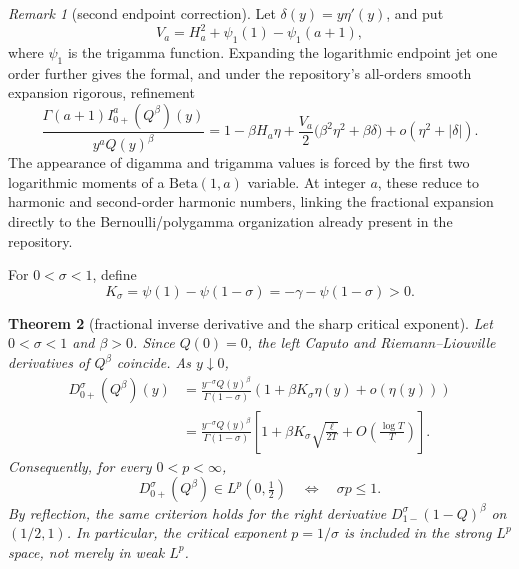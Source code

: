 \documentclass[11pt,oneside]{article}
\newtheorem{theorem}{Theorem}[section]
\theoremstyle{definition}
\theoremstyle{remark}
\newtheorem{remark}[theorem]{Remark}
\newcommand{\Q}{Q}
\newcommand{\1}{\mathbf 1}
\begin{document}
\begin{remark}[second endpoint correction]\label{p10:rem:Q-second-correction}
Let \(\delta(y)=y\eta'(y)\), and put
\begin{equation}\label{p10:eq:Va}
 V_a=H_a^2+\psi_1(1)-\psi_1(a+1),
\end{equation}
where \(\psi_1\) is the trigamma function.  Expanding the logarithmic endpoint jet one
order further gives the formal, and under the repository's all-orders smooth expansion
rigorous, refinement
\begin{equation}\label{p10:eq:Q-second-correction}
 \frac{\Gamma(a+1)I_{0+}^{a}(\Q^\beta)(y)}{y^a\Q(y)^\beta}
 =1-\beta H_a\eta
 +\frac{V_a}{2}\bigl(\beta^2\eta^2+\beta\delta\bigr)
 +o(\eta^2+|\delta|).
\end{equation}
The appearance of digamma and trigamma values is forced by the first two logarithmic
moments of a \(\mathrm{Beta}(1,a)\) variable.  At integer \(a\), these reduce to
harmonic and second-order harmonic numbers, linking the fractional expansion directly
to the Bernoulli/polygamma organization already present in the repository.
\end{remark}

For \(0<\sigma<1\), define
\begin{equation}\label{p10:eq:Ksigma}
 K_\sigma=\psi(1)-\psi(1-\sigma)
          =-\gamma-\psi(1-\sigma)>0.
\end{equation}

\begin{theorem}[fractional inverse derivative and the sharp critical exponent]
\label{p10:thm:Q-fractional-derivative-Lp}
Let \(0<\sigma<1\) and \(\beta>0\).  Since \(\Q(0)=0\), the left Caputo and
Riemann--Liouville derivatives of \(\Q^\beta\) coincide.  As \(y\downarrow0\),
\begin{align}
 D_{0+}^{\sigma}(\Q^\beta)(y)
 &=\frac{y^{-\sigma}\Q(y)^\beta}{\Gamma(1-\sigma)}
   \left(1+\beta K_\sigma\eta(y)+o(\eta(y))\right)
 \label{p10:eq:Q-frac-derivative-eta}\\
 &=\frac{y^{-\sigma}\Q(y)^\beta}{\Gamma(1-\sigma)}
   \left[
    1+\beta K_\sigma\sqrt{\frac{\ell}{2T}}
    +O\!\left(\frac{\log T}{T}\right)
   \right].
 \label{p10:eq:Q-frac-derivative-explicit}
\end{align}
Consequently, for every \(0<p<\infty\),
\begin{equation}\label{p10:eq:Q-frac-Lp-threshold}
 D_{0+}^{\sigma}(\Q^\beta)\in L^p(0,\tfrac12)
 \quad\Longleftrightarrow\quad \sigma p\le1.
\end{equation}
By reflection, the same criterion holds for the right derivative
\(D_{1-}^{\sigma}(1-\Q)^\beta\) on \((1/2,1)\).  In particular, the critical
exponent \(p=1/\sigma\) is included in the strong \(L^p\) space, not merely in weak
\(L^p\).
\end{theorem}
\end{document}
